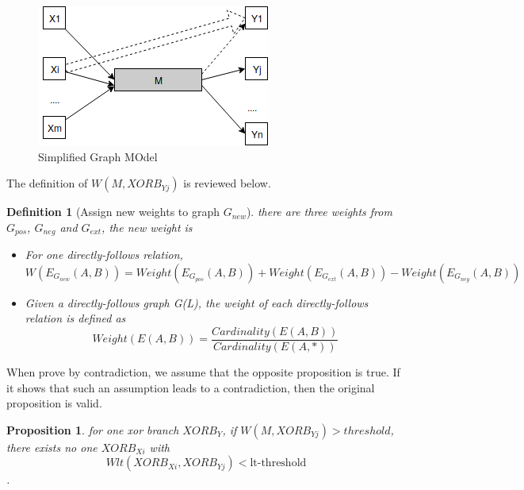 \documentclass[]{article}
\newtheorem{mydef}{Definition}[section]
\newtheorem{myproposition}{Proposition}[section]
\begin{document}
\begin{figure}[!h]
	\includegraphics[width=\textwidth]{RelationOfThreshold-LTThreshold.png}
	\caption{Simplified Graph MOdel}
	\label{fig:simplified-graph-model}
\end{figure}

The definition of $W(M, XORB_{Yj})$ is reviewed below.
\begin{mydef}[Assign new weights to graph $G_{new}$]
	there are three weights from $G_{pos}$, $G_{neg}$ and $G_{ext}$, the new weight is 
	\begin{itemize}
		\item For one directly-follows relation, \[ W(E_{G_{new}}(A,B)) = Weight(E_{G_{pos}}(A,B)) + Weight(E_{G_{ext}}(A,B)) - Weight(E_{G_{neg}}(A,B))\]
		\item Given a directly-follows graph G(L), the weight of each directly-follows relation is defined as \[ Weight(E(A,B)) = \frac{Cardinality(E(A,B))}{Cardinality(E(A,*))}  \] 
	\end{itemize}
\end{mydef}

When prove by contradiction, we assume that the opposite proposition is true. If it shows that such an assumption leads to a contradiction, then the original proposition is valid. 
\begin{myproposition}
	for one xor branch $XORB_Y$, if $W(M, XORB_{Yj}) > threshold$, \\ there exists no one $XORB_{Xi}$ with 
	\[Wlt(XORB_{Xi}, XORB_{Yj})<\text{lt-threshold}\]. 
\end{myproposition}
\end{document}
